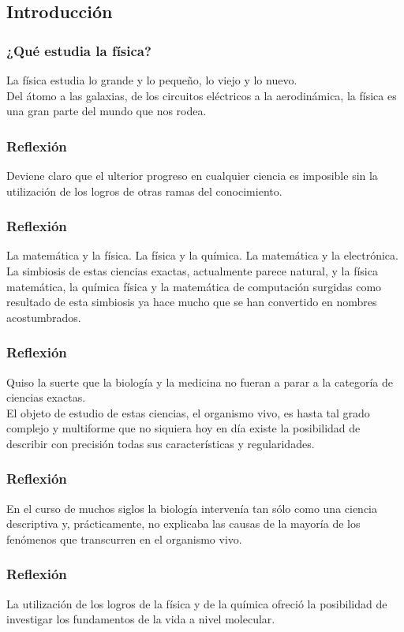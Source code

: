\subsection{Introducción}
\begin{frame}[plain]
\begin{figure}

\end{figure}
\end{frame}
\begin{frame}   
\frametitle{¿Qué estudia la física?}
La física estudia lo grande y lo pequeño, lo viejo y lo nuevo. 
\\
\bigskip
Del átomo a las galaxias, de los circuitos eléctricos a la aerodinámica, la física es una gran parte del mundo que nos rodea.
\end{frame}
\begin{frame}
\frametitle{Reflexión}
Deviene claro que el ulterior progreso en cualquier ciencia es imposible sin la utilización de los logros de otras ramas del conocimiento.
\end{frame}
\begin{frame}
\frametitle{Reflexión}
La matemática y la física. La física y la química. La matemática y la electrónica.
\\
\bigskip
\pause
La simbiosis de estas ciencias exactas, actualmente parece natural, y la física matemática, la química física y la matemática de computación surgidas como resultado de esta simbiosis ya hace mucho que se han convertido en nombres acostumbrados.
\end{frame}
\begin{frame}
\frametitle{Reflexión}
Quiso la suerte que la biología y la medicina no fueran a parar a la categoría de ciencias exactas.
\\
\bigskip
El objeto de estudio de estas ciencias, el organismo vivo, es hasta tal grado complejo y multiforme que no siquiera hoy en día existe la posibilidad de describir con precisión todas sus características y regularidades.
\end{frame}
\begin{frame}
\frametitle{Reflexión}
En el curso de muchos siglos la biología intervenía tan sólo como una ciencia descriptiva y, prácticamente, no explicaba las causas de la mayoría de los fenómenos que transcurren en el organismo vivo.
\end{frame}
\begin{frame}
\frametitle{Reflexión}
La utilización de los logros de la física y de la química ofreció la posibilidad de investigar los fundamentos de la vida a nivel molecular.
\end{frame}
